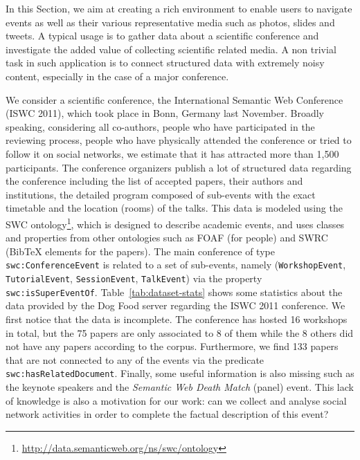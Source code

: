 In this Section, we aim at creating a rich environment to enable users to navigate events as well as their various representative media such as photos, slides and tweets. A typical usage is to gather data about a scientific conference and investigate the added value of collecting scientific related media. A non trivial task in such application is to connect structured data with extremely noisy content, especially in the case of a major conference.

 We consider a scientific conference, the International Semantic Web Conference (ISWC 2011), which took place in Bonn, Germany last November. Broadly speaking, considering all co-authors, people who have participated in the reviewing process, people who have physically attended the conference or tried to follow it on social networks, we estimate that it has attracted more than 1,500 participants. The conference organizers publish a lot of structured data regarding the conference including the list of accepted papers, their authors and institutions, the detailed program composed of sub-events with the exact timetable and the location (rooms) of the talks. This data is modeled using the SWC ontology\footnote{\url{http://data.semanticweb.org/ns/swc/ontology}}, which is designed to describe academic events, and uses classes and properties from other ontologies such as FOAF (for people) and SWRC (BibTeX elements for the papers). The main conference of type \texttt{swc:ConferenceEvent} is related to a set of sub-events, namely (\texttt{WorkshopEvent}, \texttt{TutorialEvent}, \texttt{SessionEvent}, \texttt{TalkEvent}) via the property \texttt{swc:isSuperEventOf}. Table~\ref{tab:dataset-stats} shows some statistics about the data provided by the Dog Food server regarding the ISWC 2011 conference. We first notice that the data is incomplete. The conference has hosted 16 workshops in total, but the 75 papers are only associated to 8 of them while the 8 others did not have any papers according to the corpus. Furthermore, we find 133 papers that are not connected to any of the events via the predicate \texttt{swc:hasRelatedDocument}. Finally, some useful information is also missing such as the keynote speakers and the \emph{Semantic Web Death Match} (panel) event. This lack of knowledge is also a motivation for our work: can we collect and analyse social network activities in order to complete the factual description of this event?


